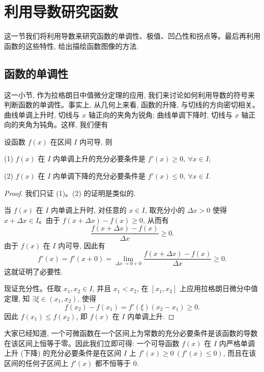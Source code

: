 \section{利用导数研究函数}
\label{sec:ma-5-4}

这一节我们将利用导数来研究函数的单调性、极值、凹凸性和拐点等。最后再利用函数的这些特性, 给出描绘函数图像的方法.

\subsection{函数的单调性}
\label{subsec:ma-5-4-1}

这一小节, 作为拉格朗日中值微分定理的应用, 我们来讨论如何利用导数的符号来判断函数的单调性。事实上, 从几何上来看, 函数的升降, 与切线的方向密切相关。曲线单调上升时, 切线与 $x$ 轴正向的夹角为锐角; 曲线单调下降时, 切线与 $x$ 轴正向的夹角为钝角。这样, 我们便有

\begin{theorem}\label{theorem:ma-5-4-1}
设函数 $f(x)$ 在区间 $I$ 内可导, 则

(1) $f(x)$ 在 $I$ 内单调上升的充分必要条件是 $f'(x)\geqslant0,\ \forall x\in I$;

(2) $f(x)$ 在 $I$ 内单调下降的充分必要条件是 $f'(x)\leqslant0,\ \forall x\in I$.
\end{theorem}


\begin{proof}
我们只证 (1)。(2) 的证明是类似的.

当 $f(x)$ 在 $I$ 内单调上升时, 对任意的 $x\in I$, 取充分小的 $\Delta x>0$ 使得 $x+\Delta x\in I$。由于 $f(x+\Delta x)-f(x)\geqslant0$, 从而有
\[
  \frac{f(x+\Delta x)-f(x)}{\Delta x}\geqslant0.
\]
由于 $f(x)$ 在 $I$ 内可导, 因此有
\[
  f'(x)=f'(x+0)=\lim_{\Delta x\to0+0}\frac{f(x+\Delta x)-f(x)}{\Delta x}\geqslant0.
\]
这就证明了必要性.

现证充分性。任取 $x_1,x_2\in I$, 并且 $x_1<x_2$, 在 $[x_1,x_2]$ 上应用拉格朗日微分中值定理, 知 $\exists\xi\in(x_1,x_2)$, 使得
\[
  f(x_2)-f(x_1)=f'(\xi)(x_2-x_1)\geqslant0.
\]
因此 $f(x_1)\leqslant f(x_2)$, 即 $f(x)$ 在 $I$ 内单调上升.
\end{proof}


\begin{remark}\label{remark:ma-5-source-104}
大家已经知道, 一个可微函数在一个区间上为常数的充分必要条件是该函数的导数在该区间上恒等于零。因此我们立即可得: 一个可导函数 $f(x)$ 在 $I$ 内严格单调上升 (下降) 的充分必要条件是在区间 $I$ 上 $f'(x)\geqslant0\ (f'(x)\leqslant0)$, 而且在该区间的任何子区间上 $f'(x)$ 都不恒等于 $0$.
\end{remark}


